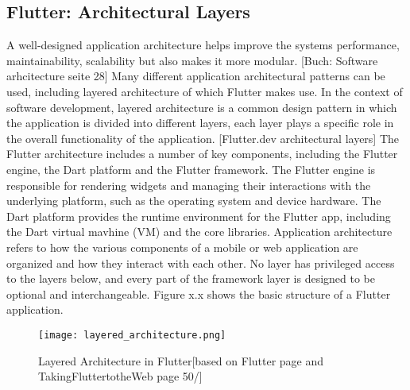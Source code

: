 \subsection{Flutter: Architectural Layers}
A well-designed application architecture helps improve the systems performance, maintainability, scalability but also makes it more modular. [Buch: Software arhcitecture seite 28] Many different application architectural patterns can be used, including layered architecture of which Flutter makes use.  In the context of software development, layered architecture is a common design pattern in which the application is divided into different layers, each layer plays a specific role in the overall functionality of the application. [Flutter.dev architectural layers] The Flutter architecture includes a number of key components, including the Flutter engine, the Dart platform and the Flutter framework. The Flutter engine is responsible for rendering widgets and managing their interactions with the underlying platform, such as the operating system and device hardware. The Dart platform provides the runtime environment for the Flutter app, including the Dart virtual mavhine (VM) and the core libraries. Application architecture refers to how the various components of a mobile or web application are organized and how they interact with each other. No layer has privileged access to the layers below, and every part of the framework layer is designed to be optional and interchangeable. Figure x.x shows the basic structure of a Flutter application. 
\begin{figure}[H]
	\centering
	\texttt{[image: layered\_architecture.png]}
	\caption[Layered Architecture in Flutter]{Layered Architecture in Flutter[based on Flutter page and TakingFluttertotheWeb page 50/]}
\end{figure}


